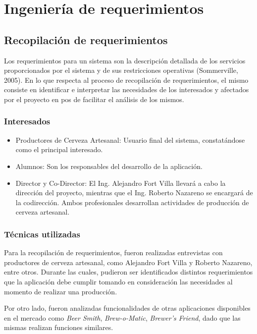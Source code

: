 \chapter{Ingeniería de requerimientos}
\section{Recopilación de requerimientos}
    \par
    Los requerimientos para un sistema son la descripción detallada de los servicios proporcionados por el sistema y de sus restricciones operativas (Sommerville, 2005). En lo que respecta al proceso de recopilación de requerimientos, el mismo consiste en identificar e interpretar las necesidades de los interesados y afectados por el proyecto en pos de facilitar el análisis de los mismos.
    
    \subsection{Interesados}
    \begin{itemize}
        \item Productores de Cerveza Artesanal: Usuario final del sistema, constatándose como el principal interesado.
        \item Alumnos: Son los responsables del desarrollo de la aplicación.
        \item Director y Co-Director: El Ing. Alejandro Fort Villa llevará a cabo la dirección del proyecto, mientras que el Ing. Roberto Nazareno se encargará de la codirección. Ambos profesionales desarrollan actividades de producción de cerveza artesanal.
    \end{itemize}
    
    \subsection{Técnicas utilizadas}
    \par
    Para la recopilación de requerimientos, fueron realizadas entrevistas con productores de cerveza artesanal, como Alejandro Fort Villa y Roberto Nazareno, entre otros. Durante las cuales, pudieron ser identificados distintos requerimientos que la aplicación debe cumplir tomando en consideración las necesidades al momento de realizar una producción. 
    \par
    Por otro lado, fueron analizadas funcionalidades de otras aplicaciones disponibles en el mercado como \textit{Beer Smith}\textsuperscript{\textregistered}, \textit{Brew-o-Matic}\textsuperscript{\textregistered}, \textit{Brewer’s Friend}\textsuperscript{\textregistered}, dado que las mismas realizan funciones similares.
    
